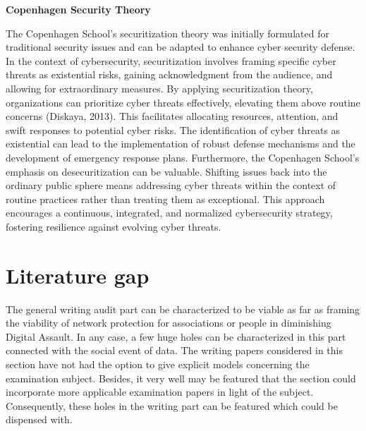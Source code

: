 \textbf{Copenhagen Security Theory}

The Copenhagen School's securitization theory was initially formulated for traditional security issues and can be adapted to enhance cyber security defense. In the context of cybersecurity, securitization involves framing specific cyber threats as existential risks, gaining acknowledgment from the audience, and allowing for extraordinary measures. By applying securitization theory, organizations can prioritize cyber threats effectively, elevating them above routine concerns (Diskaya, 2013). This facilitates allocating resources, attention, and swift responses to potential cyber risks. The identification of cyber threats as existential can lead to the implementation of robust defense mechanisms and the development of emergency response plans.
Furthermore, the Copenhagen School's emphasis on desecuritization can be valuable. Shifting issues back into the ordinary public sphere means addressing cyber threats within the context of routine practices rather than treating them as exceptional. This approach encourages a continuous, integrated, and normalized cybersecurity strategy, fostering resilience against evolving cyber threats.

\section{Literature gap}
\label{sec:into_back}
The general writing audit part can be characterized to be viable as far as framing the viability of network protection for associations or people in diminishing Digital Assault. In any case, a few huge holes can be characterized in this part connected with the social event of data. The writing papers considered in this section have not had the option to give explicit models concerning the examination subject. Besides, it very well may be featured that the section could incorporate more applicable examination papers in light of the subject. Consequently, these holes in the writing part can be featured which could be dispensed with.

